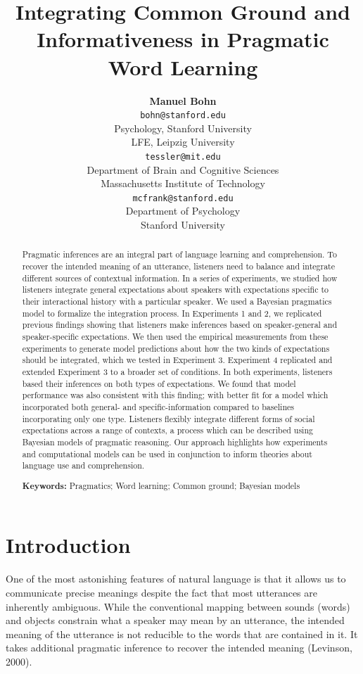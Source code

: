 \documentclass[10pt, letterpaper]{article}
\title{Integrating Common Ground and Informativeness in Pragmatic Word Learning}
\author{{\large \bf Manuel Bohn} \\ \texttt{bohn@stanford.edu} \\ Psychology, Stanford University \\ LFE, Leipzig University 
 \And {\large \bf Michael Henry Tessler} \\ \texttt{tessler@mit.edu} \\ Department of Brain and Cognitive Sciences \\ Massachusetts Institute of Technology
 \And {\large \bf Michael C. Frank} \\ \texttt{mcfrank@stanford.edu} \\ Department of Psychology \\ Stanford University}
\begin{document}
\maketitle

\begin{abstract}
Pragmatic inferences are an integral part of language learning and
comprehension. To recover the intended meaning of an utterance,
listeners need to balance and integrate different sources of contextual
information. In a series of experiments, we studied how listeners
integrate general expectations about speakers with expectations specific
to their interactional history with a particular speaker. We used a
Bayesian pragmatics model to formalize the integration process. In
Experiments 1 and 2, we replicated previous findings showing that
listeners make inferences based on speaker-general and speaker-specific
expectations. We then used the empirical measurements from these
experiments to generate model predictions about how the two kinds of
expectations should be integrated, which we tested in Experiment 3.
Experiment 4 replicated and extended Experiment 3 to a broader set of
conditions. In both experiments, listeners based their inferences on
both types of expectations. We found that model performance was also
consistent with this finding; with better fit for a model which
incorporated both general- and specific-information compared to
baselines incorporating only one type. Listeners flexibly integrate
different forms of social expectations across a range of contexts, a
process which can be described using Bayesian models of pragmatic
reasoning. Our approach highlights how experiments and computational
models can be used in conjunction to inform theories about language use
and comprehension.

\textbf{Keywords:}
Pragmatics; Word learning; Common ground; Bayesian models
\end{abstract}

\section{Introduction}\label{introduction}

One of the most astonishing features of natural language is that it
allows us to communicate precise meanings despite the fact that most
utterances are inherently ambiguous. While the conventional mapping
between sounds (words) and objects constrain what a speaker may mean by
an utterance, the intended meaning of the utterance is not reducible to
the words that are contained in it. It takes additional pragmatic
inference to recover the intended meaning (Levinson, 2000).
\end{document}
